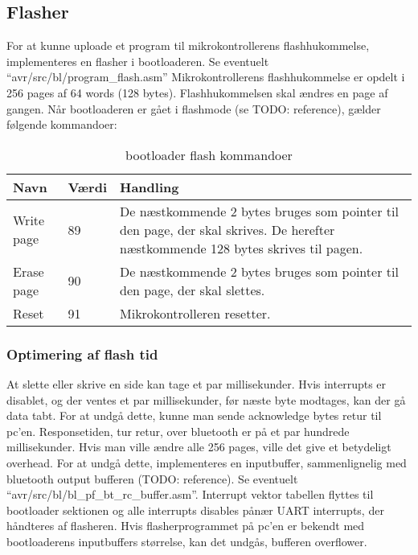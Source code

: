 \subsection{Flasher}
For at kunne uploade et program til mikrokontrollerens flashhukommelse, implementeres en flasher i bootloaderen.
Se eventuelt ``avr/src/bl/program\_flash.asm''
Mikrokontrollerens flashhukommelse er opdelt i 256 pages af 64 words (128 bytes). Flashhukommelsen skal ændres en page af gangen.
Når bootloaderen er gået i flashmode (se TODO: reference), gælder følgende kommandoer:
\begin{table}[H]
	\caption{bootloader flash kommandoer}
	\label{tab:blflashcommands}
	\centering
	\begin{tabular}{|l|l|p{13cm}|}
		\hline
		\textbf{Navn} & \textbf{Værdi} & \textbf{Handling} \\
		\hline
		Write page & 89 & De næstkommende 2 bytes bruges som pointer til den page, der skal skrives. De herefter næstkommende 128 bytes skrives til pagen.\\
		\hline
		Erase page & 90 & De næstkommende 2 bytes bruges som pointer til den page, der skal slettes.\\
		\hline
		Reset & 91 & Mikrokontrolleren resetter.\\
		\hline
	\end{tabular}
\end{table}
\subsubsection{Optimering af flash tid}
At slette eller skrive en side kan tage et par millisekunder. Hvis interrupts er disablet, og der ventes et par millisekunder, før næste byte modtages, kan der gå data tabt. For at undgå dette, kunne man sende acknowledge bytes retur til pc'en. Responsetiden, tur retur, over bluetooth er på et par hundrede millisekunder. Hvis man ville ændre alle 256 pages, ville det give et betydeligt overhead.
For at undgå dette, implementeres en inputbuffer, sammenlignelig med bluetooth output bufferen (TODO: reference). Se eventuelt ``avr/src/bl/bl\_pf\_bt\_rc\_buffer.asm''. Interrupt vektor tabellen flyttes til bootloader sektionen og alle interrupts disables pånær UART interrupts, der håndteres af flasheren. Hvis flasherprogrammet på pc'en er bekendt med bootloaderens inputbuffers størrelse, kan det undgås, bufferen overflower.

